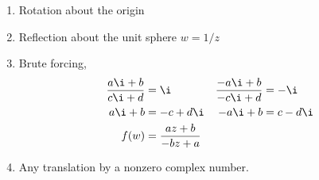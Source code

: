 \begin{enumerate}
    \item Rotation about the origin

    \item Reflection about the unit sphere $ w = 1/z $

    \item Brute forcing,
          \begin{align}
              \frac{a\i + b}{c\i + d}   & = \i                     &
              \frac{-a\i + b}{-c\i + d} & = -\i                      \\
              a\i + b                   & = -c + d\i               &
              -a\i + b                  & = c - d\i                  \\
              f(w)                      & = \frac{az + b}{-bz + a}
          \end{align}

    \item Any translation by a nonzero complex number.
\end{enumerate}
